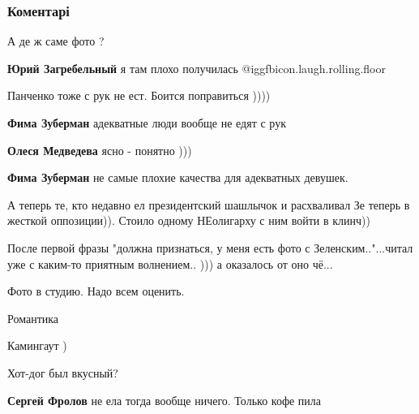  
 
 
 
 
\subsubsection{Коментарі}
\label{sec:26_11_2021.fb.medvedeva_olesja.1.fotka_s_zelenskim.cmt}

\begin{itemize} %
А де ж саме фото ?

\textbf{Юрий Загребельный} я там плохо получилась  @igg{fbicon.laugh.rolling.floor} 

Панченко тоже с рук не ест. Боится поправиться ))))

\begin{itemize} %
\textbf{Фима Зуберман} адекватные люди вообще не едят с рук

\textbf{Олеся Медведева} ясно - понятно )))

\textbf{Фима Зуберман} не самые плохие качества для адекватных девушек.
\end{itemize} %

А теперь те, кто недавно ел президентский шашлычок и расхваливал Зе теперь в жесткой оппозиции)). Стоило одному НЕолигарху с ним войти в клинч))

После первой фразы "должна признаться, у меня есть фото с Зеленским.."...читал уже с каким-то приятным волнением.. ))) а оказалось от оно чё...


Фото в студию. Надо всем оценить.

Романтика

Камингаут )

Хот-дог был вкусный?

\begin{itemize} %
\textbf{Сергей Фролов} не ела тогда вообще ничего. Только кофе пила


\end{itemize}
\end{itemize}
